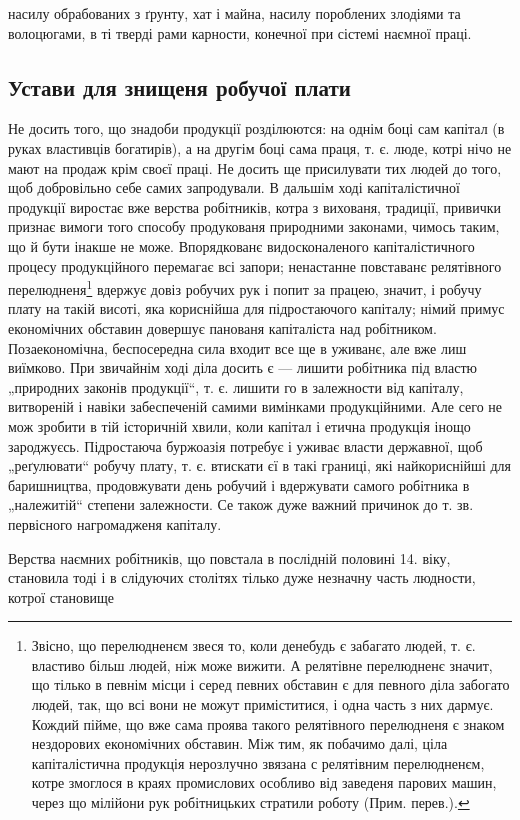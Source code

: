 \parcont{}
насилу обрабованих з ґрунту, хат і майна, насилу пороблених
злодіями та волоцюгами, в ті тверді рами карности,
конечної при сістемі наємної праці.

\subsection{Устави для знищеня робучої плати}

Не досить того, що знадоби продукції розділюются:
на однім боці сам капітал (в руках властивців богатирів),
а на другім боці сама праця, т. є. люде, котрі нічо не мают
на продаж крім своєї праці. Не досить ще присилувати
тих людей до того, щоб добровільно себе самих запродували.
В дальшім ході капіталістичної продукції виростає
вже верства робітників, котра з вихованя, традиції, привички
признає вимоги того способу продукованя природними законами,
чимось таким, що й бути інакше не може. Впорядкованє
видосконаленого капіталістичного процесу продукційного
перемагає всі запори; ненастанне повставанє релятівного
перелюдненя\footnote*{
Звісно, що перелюдненєм звеся то, коли денебудь є забагато
людей, т. є. властиво більш людей, ніж може вижити. А релятівне перелюдненє
значит, що тілько в певнім місци і серед певних обставин є для
певного діла забогато людей, так, що всі вони не можут приміститися,
і одна часть з них дармує. Кождий пійме, що вже сама проява такого
релятівного перелюдненя є знаком нездорових економічних обставин.
Між тим, як побачимо далі, ціла капіталістична продукція нерозлучно
звязана с релятівним перелюдненєм, котре змоглося в краях промислових
особливо від заведеня парових машин, через що мілійони рук робітницьких
стратили роботу (Прим. перев.).
} вдержує довіз робучих рук і попит
за працею, значит, і робучу плату на такій висоті, яка кориснійша
для підростаючого капіталу; німий примус економічних
обставин довершує панованя капіталіста над робітником.
Позаекономічна, беспосередна сила входит все ще
в уживанє, але вже лиш виїмково. При звичайнім ході діла
досить є — лишити робітника під властю „природних законів
продукції“, т. є. лишити го в залежности від капіталу,
витвореній і навіки забеспеченій самими вимінками
продукційними. Але сего не мож зробити в тій історичній
хвили, коли капітал і етична продукція інощо зароджуєсь.
Підростаюча буржоазія потребує і уживає власти державної,
щоб „реґулювати“ робучу плату, т. є. втискати єї в такі
границі, які найкориснійші для баришництва, продовжувати
день робучий і вдержувати самого робітника в „належитій“
степени залежности. Се також дуже важний причинок до
т. зв. первісного нагромадженя капіталу.

Верства наємних робітників, що повстала в послідній
половині 14. віку, становила тоді і в слідуючих столітях
тілько дуже незначну часть людности, котрої становище
\parbreak{}
